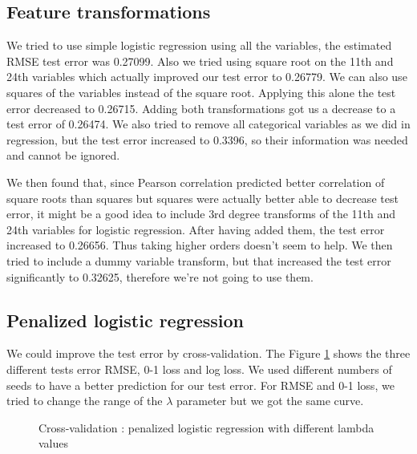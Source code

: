 \documentclass{article} %
\begin{document}
\subsection{Feature transformations}
\label{sec:ftransclass}
We tried to use simple logistic regression using all the variables, the estimated RMSE test error was 0.27099. Also we tried using square root on the 11th and 24th variables which actually improved our test error to 0.26779. We can also use squares of the variables instead of the square root. Applying this alone the test error decreased to 0.26715. Adding both transformations got us a decrease to a test error of 0.26474. We also tried to remove all categorical variables as we did in regression, but the test error increased to 0.3396, so their information was needed and cannot be ignored.

We then found that, since Pearson correlation predicted better correlation of square roots than squares but squares were actually better able to decrease test error, it might be a good idea to include 3rd degree transforms of the 11th and 24th variables for logistic regression. After having added them, the test error increased to 0.26656. Thus taking higher orders doesn’t seem to help. We then tried to include a dummy variable transform, but that increased the test error significantly to 0.32625, therefore we’re not going to use them.
\subsection{Penalized logistic regression}
We could improve the test error by cross-validation. The Figure \ref{fig:crossval} shows the three different tests error RMSE, 0-1 loss and log loss. We used different numbers of seeds to have a better prediction for our test error. For RMSE and 0-1 loss, we tried to change the range of the $\lambda$ parameter but we got the same curve.
\begin{figure}
\centering
{}
\caption{Cross-validation : penalized logistic regression with different lambda values}
\label{fig:crossval}
\end{figure} 
\end{document}
